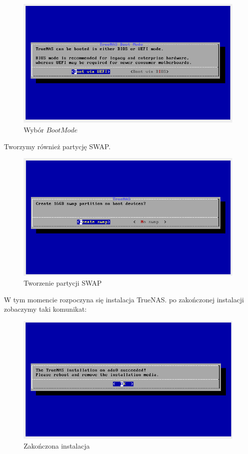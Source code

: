 \documentclass[12pt,a4paper]{article}
\newcommand{\<}{\langle}
\renewcommand{\>}{\rangle}
\theoremstyle{definition}
\begin{document}
\begin{figure}[H]
    \centering
    \includegraphics[width=\linewidth]{img/ss_truenas/7.png}
    \caption{Wybór $Boot Mode$}
    \label{install_uefi}
\end{figure}

Tworzymy również partycję SWAP.
\begin{figure}[H]
    \centering
    \includegraphics[width=\linewidth]{img/ss_truenas/8.png}
    \caption{Tworzenie partycji SWAP}
    \label{install_swap}
\end{figure}

W tym momencie rozpoczyna się instalacja TrueNAS. po zakończonej instalacji zobaczymy taki komunikat:

\begin{figure}[H]
    \centering
    \includegraphics[width=\linewidth]{img/ss_truenas/11.png}
    \caption{Zakończona instalacja}
    \label{install_complete}
\end{figure}
\end{document}
